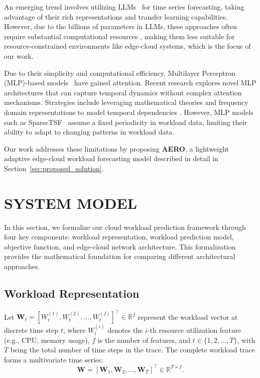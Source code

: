 \documentclass{ieeetmlcn}
\begin{document}
An emerging trend involves utilizing LLMs~\cite{tang2023one, liu2023large} for time series forecasting, taking advantage of their rich representations and transfer learning capabilities. However, due to the billions of parameters in LLMs, these approaches often require substantial computational resources \cite{rasul2023forecasting}, making them less suitable for resource-constrained environments like edge-cloud systems, which is the focus of our work.\textbf{}

Due to their simplicity and computational efficiency, Multilayer Perceptron (MLP)-based models~\cite{zeng2023koopa, wu2023timemlp, liu2023fits} have gained attention. Recent research explores novel MLP architectures that can capture temporal dynamics without complex attention mechanisms. Strategies include leveraging mathematical theories and frequency domain representations to model temporal dependencies \cite{zhou2023patchTST}. However, MLP models such as SparseTSF~\cite{sparseTSF} assume a fixed periodicity in workload data, limiting their ability to adapt to changing patterns in workload data.

Our work addresses these limitations by proposing \textbf{AERO}, a lightweight adaptive edge-cloud workload forecasting model described in detail in Section~\ref{sec:proposed_solution}.

\section{SYSTEM MODEL}
\label{sec:system_model}

In this section, we formalize our cloud workload prediction framework through four key components: workload representation, workload prediction model, objective function, and edge-cloud network architecture. This formalization provides the mathematical foundation for comparing different architectural approaches.

\subsection{Workload Representation}

Let $\mathbf{W}_t = [W_t^{(1)},  W_t^{(2)},  \ldots,  W_t^{(f)}]^\top \in \mathbb{R}^f$ represent the workload vector \cite{zhou2021informer} at discrete time step $t$, where $W_t^{(i)}$ denotes the $i$-th resource utilization feature (e.g., CPU, memory usage), $f$ is the number of features, and $t \in \{1, 2, \ldots, T\}$, with $T$ being the total number of time steps in the trace. The complete workload trace forms a multivariate time series:
\begin{equation}
\mathbf{W} = [\mathbf{W}_1,  \mathbf{W}_2,  \ldots,  \mathbf{W}_T]^\top \in \mathbb{R}^{T \times f}.
\end{equation}
\end{document}
